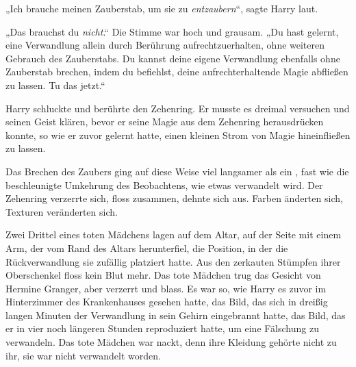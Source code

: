 „Ich brauche meinen Zauberstab, um sie zu \emph{entzaubern}“, sagte Harry laut.

„Das brauchst du \emph{nicht}.“ Die Stimme war hoch und grausam.
„Du hast gelernt, eine Verwandlung allein durch Berührung aufrechtzuerhalten, ohne weiteren Gebrauch des Zauberstabs. Du kannst deine eigene Verwandlung ebenfalls ohne Zauberstab brechen, indem du befiehlst, deine aufrechterhaltende Magie abfließen zu lassen. Tu das jetzt.“

Harry schluckte und berührte den Zehenring. Er musste es dreimal versuchen und seinen Geist klären, bevor er seine Magie aus dem Zehenring herausdrücken konnte, so wie er zuvor gelernt hatte, einen kleinen Strom von Magie hineinfließen zu lassen.

Das Brechen des Zaubers ging auf diese Weise viel langsamer als ein , fast wie die beschleunigte Umkehrung des Beobachtens, wie etwas verwandelt wird. Der Zehenring verzerrte sich, floss zusammen, dehnte sich aus. Farben änderten sich, Texturen veränderten sich.

Zwei Drittel eines toten Mädchens lagen auf dem Altar, auf der Seite mit einem Arm, der vom Rand des Altars herunterfiel, die Position, in der die Rückverwandlung sie zufällig platziert hatte. Aus den zerkauten Stümpfen ihrer Oberschenkel floss kein Blut mehr. Das tote Mädchen trug das Gesicht von Hermine Granger, aber verzerrt und blass. Es war so, wie Harry es zuvor im Hinterzimmer des Krankenhauses gesehen hatte, das Bild, das sich in dreißig langen Minuten der Verwandlung in sein Gehirn eingebrannt hatte, das Bild, das er in vier noch längeren Stunden reproduziert hatte, um eine Fälschung zu verwandeln. Das tote Mädchen war nackt, denn ihre Kleidung gehörte nicht zu ihr, sie war nicht verwandelt worden.

